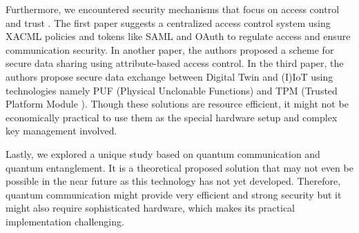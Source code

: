 Furthermore, we encountered security mechanisms that focus on access control and trust \cite{gehrmannDigitalTwinBased2020, chengzhelaiSPDTSecurePrivacyPreserving2022, debenedictisAdoptionSecureCyber2022}. The first paper suggests a centralized access control system using XACML policies and tokens like SAML and OAuth to regulate access and ensure communication security. In another paper, the authors proposed a scheme for secure data sharing using attribute-based access control. In the third paper, the authors propose secure data exchange between Digital Twin and (I)IoT using technologies namely PUF (Physical Unclonable Functions) and TPM (Trusted Platform Module ). Though these solutions are resource efficient, it might not be economically practical to use them as the special hardware setup and complex key management involved. 


Lastly, we explored a unique study \cite{lvDigitalTwinsBased2022} based on quantum communication and quantum entanglement. It is a theoretical proposed solution that may not even be possible in the near future as this technology has not yet developed. Therefore, quantum communication might provide very efficient and strong security but it might also require sophisticated hardware, which makes its practical implementation challenging.



